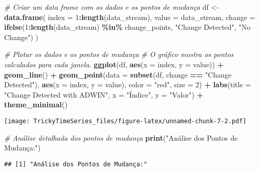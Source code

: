 \documentclass[
]{article}
\newenvironment{Shaded}{\begin{snugshade}}{\end{snugshade}}
\newcommand{\AttributeTok}[1]{\textcolor[rgb]{0.13,0.29,0.53}{#1}}
\newcommand{\CommentTok}[1]{\textcolor[rgb]{0.56,0.35,0.01}{\textit{#1}}}
\newcommand{\DecValTok}[1]{\textcolor[rgb]{0.00,0.00,0.81}{#1}}
\newcommand{\FunctionTok}[1]{\textcolor[rgb]{0.13,0.29,0.53}{\textbf{#1}}}
\newcommand{\NormalTok}[1]{#1}
\newcommand{\OtherTok}[1]{\textcolor[rgb]{0.56,0.35,0.01}{#1}}
\newcommand{\SpecialCharTok}[1]{\textcolor[rgb]{0.81,0.36,0.00}{\textbf{#1}}}
\newcommand{\StringTok}[1]{\textcolor[rgb]{0.31,0.60,0.02}{#1}}
\begin{document}
\begin{Shaded}
\begin{Highlighting}[]
\CommentTok{\# Criar um data frame com os dados e os pontos de mudança}
\NormalTok{df }\OtherTok{\textless{}{-}} \FunctionTok{data.frame}\NormalTok{(}
  \AttributeTok{index =} \DecValTok{1}\SpecialCharTok{:}\FunctionTok{length}\NormalTok{(data\_stream),}
  \AttributeTok{value =}\NormalTok{ data\_stream,}
  \AttributeTok{change =} \FunctionTok{ifelse}\NormalTok{(}\DecValTok{1}\SpecialCharTok{:}\FunctionTok{length}\NormalTok{(data\_stream) }\SpecialCharTok{\%in\%}\NormalTok{ change\_points, }\StringTok{"Change Detected"}\NormalTok{, }\StringTok{"No Change"}\NormalTok{)}
\NormalTok{)}

\CommentTok{\# Plotar os dados e os pontos de mudança}
\CommentTok{\# O gráfico mostra os pontos calculados para cada janela.}
\FunctionTok{ggplot}\NormalTok{(df, }\FunctionTok{aes}\NormalTok{(}\AttributeTok{x =}\NormalTok{ index, }\AttributeTok{y =}\NormalTok{ value)) }\SpecialCharTok{+}
  \FunctionTok{geom\_line}\NormalTok{() }\SpecialCharTok{+}
  \FunctionTok{geom\_point}\NormalTok{(}\AttributeTok{data =} \FunctionTok{subset}\NormalTok{(df, change }\SpecialCharTok{==} \StringTok{"Change Detected"}\NormalTok{), }\FunctionTok{aes}\NormalTok{(}\AttributeTok{x =}\NormalTok{ index, }\AttributeTok{y =}\NormalTok{ value), }\AttributeTok{color =} \StringTok{"red"}\NormalTok{, }\AttributeTok{size =} \DecValTok{2}\NormalTok{) }\SpecialCharTok{+}
  \FunctionTok{labs}\NormalTok{(}\AttributeTok{title =} \StringTok{"Change Detected with ADWIN"}\NormalTok{, }\AttributeTok{x =} \StringTok{"Índice"}\NormalTok{, }\AttributeTok{y =} \StringTok{"Valor"}\NormalTok{) }\SpecialCharTok{+}
  \FunctionTok{theme\_minimal}\NormalTok{()}
\end{Highlighting}
\end{Shaded}

\texttt{[image: TrickyTimeSeries\_files/figure-latex/unnamed-chunk-7-2.pdf]}

\begin{Shaded}
\begin{Highlighting}[]
\CommentTok{\# Análise detalhada dos pontos de mudança}
\FunctionTok{print}\NormalTok{(}\StringTok{"Análise dos Pontos de Mudança:"}\NormalTok{)}
\end{Highlighting}
\end{Shaded}

\begin{verbatim}
## [1] "Análise dos Pontos de Mudança:"
\end{verbatim}
\end{document}
